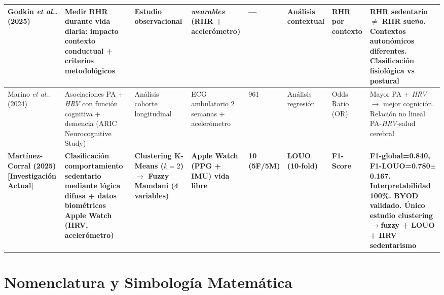 \begin{landscape}
\begin{longtable}{@{}p{1.8cm}p{2.5cm}p{1.8cm}p{1.5cm}p{0.9cm}p{1.3cm}p{2.0cm}p{1.8cm}@{}}
\midrule


Godkin \textit{et al.}. (2025) \cite{Godkin2025Context} & 
Medir RHR durante vida diaria: impacto contexto conductual + criterios metodológicos & 
Estudio observacional & 
\textit{wearables} (RHR + acelerómetro) & 
--- & 
Análisis contextual & 
RHR por contexto & 
\textbf{RHR sedentario $\neq$ RHR sueño}. Contextos autonómicos diferentes. Clasificación fisiológica vs postural \\

\midrule

Marino \textit{et al.}. (2024) \cite{Marino2024ARIC} & 
Asociaciones PA + \textit{HRV} con función cognitiva + demencia (ARIC Neurocognitive Study) & 
Análisis cohorte longitudinal & 
ECG ambulatorio 2 semanas + acelerómetro & 
961 & 
Análisis regresión & 
Odds Ratio (OR) & 
Mayor PA + \textit{HRV} $\rightarrow$ mejor cognición. Relación no lineal PA-\textit{HRV}-salud cerebral \\

\midrule


\textbf{Martínez-Corral (2025)} \newline \textbf{[Investigación Actual]} & 
\textbf{Clasificación comportamiento sedentario mediante lógica difusa + datos biométricos Apple Watch (HRV, acelerómetro)} & 
\textbf{Clustering K-Means ($k=2$) $\rightarrow$ Fuzzy Mamdani (4 variables)} & 
\textbf{Apple Watch (PPG + IMU) vida libre} & 
\textbf{10 (5F/5M)} & 
\textbf{LOUO (10-fold)} & 
\textbf{F1-Score} & 
\textbf{F1-global=0.840, F1-LOUO=0.780$\pm$0.167. Interpretabilidad 100\%. BYOD validado. Único estudio clustering$\rightarrow$fuzzy + LOUO + HRV sedentarismo} \\

\end{longtable}
\end{landscape}


\section{Nomenclatura y Simbología Matemática}
\label{sec:nomenclatura}

